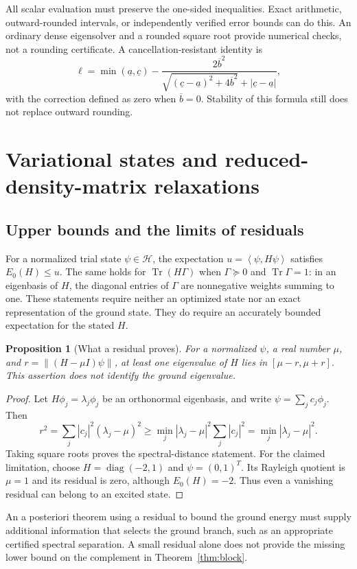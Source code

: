 \documentclass[11pt,a4paper]{article}
\theoremstyle{plain}
\newtheorem{proposition}[theorem]{Proposition}
\theoremstyle{definition}
\theoremstyle{remark}
\DeclareMathOperator{\Tr}{Tr}
\newcommand{\norm}[1]{\left\lVert #1\right\rVert}
\newcommand{\ip}[2]{\left\langle #1,#2\right\rangle}
\begin{document}
All scalar evaluation must preserve the one-sided inequalities. Exact
arithmetic, outward-rounded intervals, or independently verified error bounds
can do this. An ordinary dense eigensolver and a rounded square root provide
numerical checks, not a rounding certificate. A cancellation-resistant identity
is
\[
 \ell=\min(\underline a,\underline c)
 -\frac{2\overline b^2}
 {\sqrt{(\underline c-\underline a)^2+4\overline b^2}
       +|\underline c-\underline a|},
\]
with the correction defined as zero when $\overline b=0$. Stability of this
formula still does not replace outward rounding.

\section{Variational states and reduced-density-matrix relaxations}
\label{sec:rdm}
\subsection{Upper bounds and the limits of residuals}
For a normalized trial state $\psi\in\mathcal H$, the expectation
$u=\ip{\psi}{H\psi}$ satisfies $E_0(H)\le u$. The same holds for
$\Tr(H\Gamma)$ when $\Gamma\succeq0$ and $\Tr\Gamma=1$: in an
eigenbasis of $H$, the diagonal entries of $\Gamma$ are nonnegative
weights summing to one. These statements require neither an optimized state
nor an exact representation of the ground state. They do require an
accurately bounded expectation for the stated $H$.

\begin{proposition}[What a residual proves]
\label{prop:residual}
For a normalized $\psi$, a real number $\mu$, and
$r=\norm{(H-\mu I)\psi}$, at least one eigenvalue of $H$ lies in
$[\mu-r,\mu+r]$. This assertion does not identify the ground eigenvalue.
\end{proposition}
\begin{proof}
Let $H\phi_j=\lambda_j\phi_j$ be an orthonormal eigenbasis, and write
$\psi=\sum_j c_j\phi_j$. Then
\[
 r^2=\sum_j|c_j|^2(\lambda_j-\mu)^2
 \ge\min_j|\lambda_j-\mu|^2\sum_j|c_j|^2
 =\min_j|\lambda_j-\mu|^2.
\]
Taking square roots proves the spectral-distance statement. For the claimed
limitation, choose $H=\operatorname{diag}(-2,1)$ and $\psi=(0,1)^T$.
Its Rayleigh quotient is $\mu=1$ and its residual is zero, although
$E_0(H)=-2$. Thus even a vanishing residual can belong to an excited state.
\end{proof}

An a posteriori theorem using a residual to bound the ground energy must
supply additional information that selects the ground branch, such as an
appropriate certified spectral separation. A small residual alone does not
provide the missing lower bound on the complement in
Theorem~\ref{thm:block}.
\end{document}
